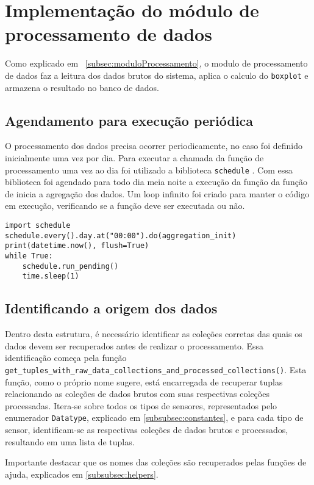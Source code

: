 \section[Implementação do módulo de processamento de dados]{Implementação do módulo de processamento de dados}\label{sec:ImplModuloProcessamento}

Como explicado em ~\ref{subsec:moduloProcessamento}, o modulo de processamento de dados faz a leitura dos dados brutos do sistema, aplica o calculo do \texttt{boxplot} e armazena o resultado no banco de dados.

\subsection{Agendamento para execução periódica}
O processamento dos dados precisa ocorrer periodicamente, no caso foi definido inicialmente uma vez por dia. Para executar a chamada da função de processamento uma vez ao dia foi utilizado a biblioteca \texttt{schedule} \cite{scheduleDocs}. Com essa biblioteca foi agendado para todo dia meia noite a execução da função da função de inicia a agregação dos dados. Um loop infinito foi criado para manter o código em execução, verificando se a função deve ser executada ou não.

\begin{verbatim}
import schedule
schedule.every().day.at("00:00").do(aggregation_init)
print(datetime.now(), flush=True)
while True:
    schedule.run_pending()
    time.sleep(1)
\end{verbatim}

\subsection{Identificando a origem dos dados}
Dentro desta estrutura, é necessário identificar as coleções corretas das quais os dados devem ser recuperados antes de realizar o processamento. Essa identificação começa pela função \texttt{get\_tuples\_with\_raw\_data\_collections\_and\_processed\_collections()}. Esta função, como o próprio nome sugere, está encarregada de recuperar tuplas relacionando as coleções de dados brutos com suas respectivas coleções processadas. Itera-se sobre todos os tipos de sensores, representados pelo enumerador \texttt{Datatype}, explicado em \ref{subsubsec:constantes}, e para cada tipo de sensor, identificam-se as respectivas coleções de dados brutos e processados, resultando em uma lista de tuplas. 

Importante destacar que os nomes das coleções são recuperados pelas funções de ajuda, explicados em \ref{subsubsec:helpers}.

